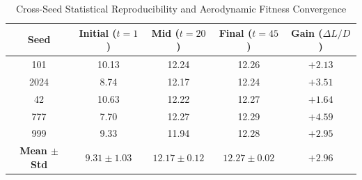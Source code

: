 \begin{table}[t]
\centering
\caption{Cross-Seed Statistical Reproducibility and Aerodynamic Fitness Convergence}
\label{tab:multi_seed_convergence}
\small
\begin{tabular}{ccccc}
\hline
\textbf{Seed} &
\textbf{Initial ($t=1$)} &
\textbf{Mid ($t=20$)} &
\textbf{Final ($t=45$)} &
\textbf{Gain ($\Delta L/D$)} \\
\hline
101  & 10.13 & 12.24 & 12.26 & $+2.13$ \\
2024 &  8.74 & 12.17 & 12.24 & $+3.51$ \\
42   & 10.63 & 12.22 & 12.27 & $+1.64$ \\
777  &  7.70 & 12.27 & 12.29 & $+4.59$ \\
999  &  9.33 & 11.94 & 12.28 & $+2.95$ \\
\hline
\textbf{Mean $\pm$ Std} & $9.31 \pm 1.03$ & $12.17 \pm 0.12$ & $12.27 \pm 0.02$ & $+2.96$ \\
\hline
\end{tabular}
\normalsize
\end{table}
